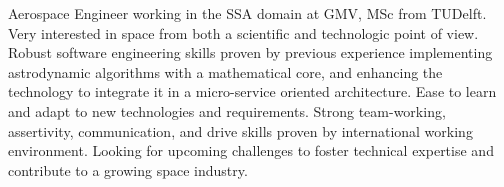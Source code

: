 \documentclass[letter,10pt]{article}
\begin{document}
\justifying

Aerospace Engineer working in the SSA domain at GMV, MSc from TUDelft. Very interested in space from both a scientific and technologic point of view. Robust software engineering skills proven by previous experience implementing astrodynamic algorithms with a mathematical core, and enhancing the technology to integrate it in a micro-service oriented architecture. Ease to learn and adapt to new technologies and requirements. Strong team-working, assertivity, communication, and drive skills proven by international working environment. Looking for upcoming challenges to foster technical expertise and contribute to a growing space industry.
\end{document}
